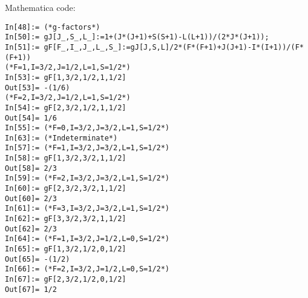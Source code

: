 \documentclass{article}
\theoremstyle{definition}
\begin{document}
\noindent Mathematica code:
\begin{lstlisting}
In[48]:= (*g-factors*)
In[50]:= gJ[J_,S_,L_]:=1+(J*(J+1)+S(S+1)-L(L+1))/(2*J*(J+1));
In[51]:= gF[F_,I_,J_,L_,S_]:=gJ[J,S,L]/2*(F*(F+1)+J(J+1)-I*(I+1))/(F*(F+1))
(*F=1,I=3/2,J=1/2,L=1,S=1/2*)
In[53]:= gF[1,3/2,1/2,1,1/2]
Out[53]= -(1/6)
(*F=2,I=3/2,J=1/2,L=1,S=1/2*)
In[54]:= gF[2,3/2,1/2,1,1/2]
Out[54]= 1/6
In[55]:= (*F=0,I=3/2,J=3/2,L=1,S=1/2*)
In[63]:= (*Indeterminate*)
In[57]:= (*F=1,I=3/2,J=3/2,L=1,S=1/2*)
In[58]:= gF[1,3/2,3/2,1,1/2]
Out[58]= 2/3
In[59]:= (*F=2,I=3/2,J=3/2,L=1,S=1/2*)
In[60]:= gF[2,3/2,3/2,1,1/2]
Out[60]= 2/3
In[61]:= (*F=3,I=3/2,J=3/2,L=1,S=1/2*)
In[62]:= gF[3,3/2,3/2,1,1/2]
Out[62]= 2/3
In[64]:= (*F=1,I=3/2,J=1/2,L=0,S=1/2*)
In[65]:= gF[1,3/2,1/2,0,1/2]
Out[65]= -(1/2)
In[66]:= (*F=2,I=3/2,J=1/2,L=0,S=1/2*)
In[67]:= gF[2,3/2,1/2,0,1/2]
Out[67]= 1/2
\end{lstlisting}
\end{document}
